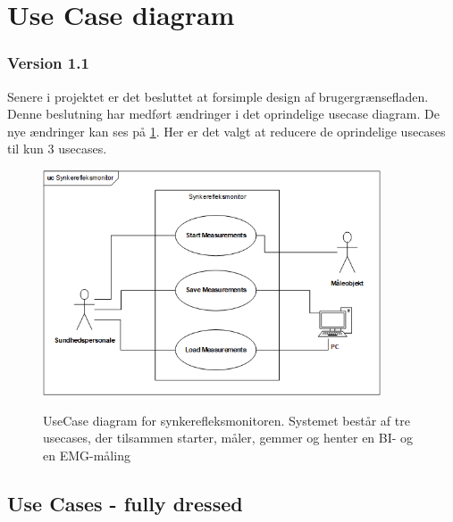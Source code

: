 \section{Use Case diagram }
\subsubsection{Version 1.1} 
Senere i projektet er det besluttet at forsimple design af brugergrænsefladen. Denne beslutning har medført ændringer i det oprindelige usecase diagram. De nye ændringer kan ses på \ref{UseCasediagramV1.1}. Her er det valgt at reducere de oprindelige usecases til kun 3 usecases. 

\begin{figure}[H]
\centering
{\includegraphics[width=10cm]
{Figure/usecasediagram}}
\caption{UseCase diagram for synkerefleksmonitoren. Systemet består af tre usecases, der tilsammen starter, måler, gemmer og henter en BI- og en EMG-måling}
\label{UseCasediagramV1.1}
\end{figure}


\subsection{Use Cases - fully dressed}

